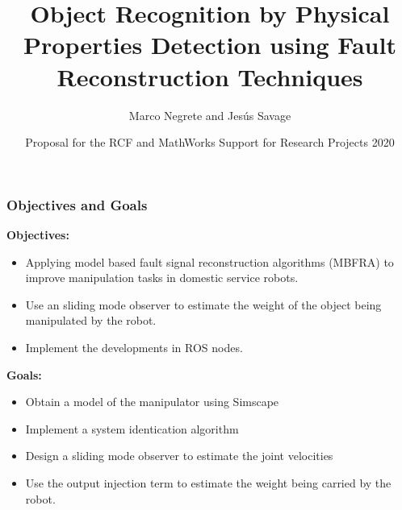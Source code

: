 \documentclass[9pt,spanish,aspectratio=1610]{beamer}
\begin{document}
\renewcommand{\tablename}{Tabla}
\renewcommand{\figurename}{Figura}

\title[Object Recognition using Fault Reconstruction Techniques]{Object Recognition by Physical Properties Detection using Fault Reconstruction Techniques}
\author[Marco Negrete and Jesús Savage]{Marco Negrete and Jesús Savage}
\date[RFC-MathWorks Support for Research Projects 2020]{Proposal for the RCF and MathWorks Support for Research Projects 2020}

\begin{frame}
\titlepage
\end{frame}

\begin{frame}\frametitle{Objectives and Goals}
  \textbf{Objectives:}
  \begin{itemize}
  \item Applying model based fault signal reconstruction algorithms (MBFRA) to improve manipulation tasks in domestic service robots.
  \item Use an sliding mode observer to estimate the weight of the object being manipulated by the robot.
  \item Implement the developments in ROS nodes.
  \end{itemize}

  \textbf{Goals:}
  \begin{itemize}
  \item Obtain a model of the manipulator using Simscape
  \item Implement a system identication algorithm
  \item Design a sliding mode observer to estimate the joint velocities
    \item Use the output injection term to estimate the weight being carried by the robot.
  \end{itemize}
\end{frame}
\end{document}

